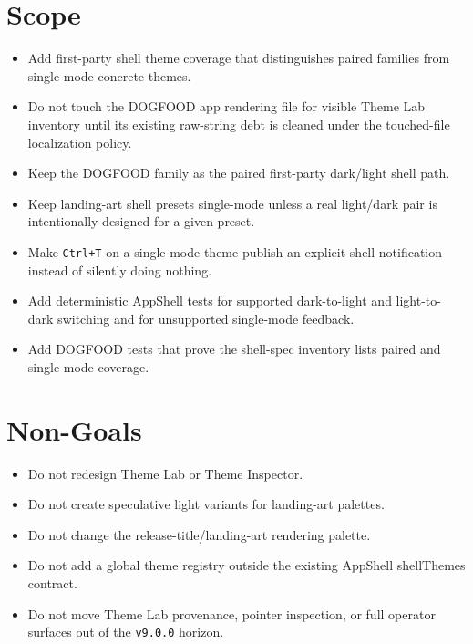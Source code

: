 \section{Scope}\label{record-183-scope}

\begin{itemize}
\tightlist
\item
  Add first-party shell theme coverage that distinguishes paired families from single-mode concrete themes.
\item
  Do not touch the DOGFOOD app rendering file for visible Theme Lab inventory until its existing raw-string debt is cleaned under the touched-file localization policy.
\item
  Keep the DOGFOOD family as the paired first-party dark/light shell path.
\item
  Keep landing-art shell presets single-mode unless a real light/dark pair is intentionally designed for a given preset.
\item
  Make \texttt{C\allowbreak{}t\allowbreak{}r\allowbreak{}l\allowbreak{}+\allowbreak{}T} on a single-mode theme publish an explicit shell notification instead of silently doing nothing.
\item
  Add deterministic AppShell tests for supported dark-to-light and light-to-dark switching and for unsupported single-mode feedback.
\item
  Add DOGFOOD tests that prove the shell-spec inventory lists paired and single-mode coverage.
\end{itemize}

\section{Non-Goals}\label{record-183-non-goals}

\begin{itemize}
\tightlist
\item
  Do not redesign Theme Lab or Theme Inspector.
\item
  Do not create speculative light variants for landing-art palettes.
\item
  Do not change the release-title/landing-art rendering palette.
\item
  Do not add a global theme registry outside the existing AppShell shellThemes contract.
\item
  Do not move Theme Lab provenance, pointer inspection, or full operator surfaces out of the \texttt{v\allowbreak{}9\allowbreak{}.\allowbreak{}0\allowbreak{}.\allowbreak{}0} horizon.
\end{itemize}

